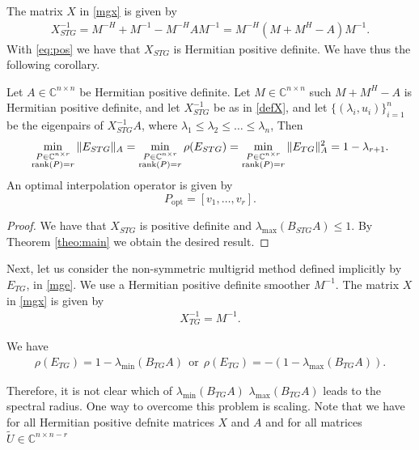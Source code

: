 \documentclass[final]{siamltex}
\newcommand{\innCnmr}{\in\mathbb{C}^{n-r}}
\newcommand{\beqo}{\begin{eqnarray*}}
\newcommand{\beq}{\begin{eqnarray}}
\newcommand{\eeqo}{\end{eqnarray*}}
\newcommand{\eeq}{\end{eqnarray}}
\numberwithin{equation}{section}
\newcommand{\ran} {{\cal R}}
\newcommand{\bCn}{\mathbb{C}^n}
\newcommand{\Cnr}{\mathbb{C}^{n \times r}}
\newcommand{\Cnnr}{\mathbb{C}^{n \times n-r}}
\newcommand{\inCnn}{\in \mathbb{C}^{n \times n}}
\begin{document}
The matrix $X$ in \eqref{mgx} is given by 
\beq \label{defX}
X^{-1}_{STG} = M^{-H} +  M^{-1} - M^{-H} AM^{-1} = M^{-H}( M +  M^{H} -
A)M^{-1}.
\eeq
With \eqref{eq:pos} we have  that $X_{STG}$ is Hermitian positive definite.
We have thus the following corollary.
\begin{corollary} \label{coro:one}
Let  $A\inCnn$  be Hermitian positive definite. Let $ M \inCnn$ such $M + M^H -
A$ is Hermitian positive definite, and
let $X_{STG}^{-1}$  be as in \eqref{defX},  and let $\{(\lambda_i,
u_i)\}_{i=1}^n$
be
the eigenpairs
of $X_{STG}^{-1}A$, where $
\lambda_1 \leq \lambda_2 \leq \ldots \leq  \lambda_n $, 
 Then
\beq
\min_{\substack{P \in \Cnr \\ \rank(P)=r}} \|E_{STG}\|_A =
\min_{\substack{P \in \Cnr \\ \rank(P)=r}}\rho(E_{STG}) = 
\min_{\substack{P \in \Cnr \\ \rank(P)=r}}\|E_{TG}\|_A^2 = 1 -
\lambda_{r+1}.
\eeq
An optimal interpolation operator is given by 
\[
P_{\mathrm{opt}} = [v_{1}, \ldots , v_r].
\]
\end{corollary}
\begin{proof}
We have  that $X_{STG}$ is positive definite and $\lambda_{\max}(B_{STG}A) \leq
1$. By Theorem \ref{theo:main} we obtain the desired result.
\end{proof}

Next, let us consider  the non-symmetric multigrid method defined implicitly
by $E_{TG}$, in \eqref{mge}.
We use a Hermitian positive  definite smoother $M^{-1}$. The matrix $X$ in
\eqref{mgx} is given by
\beq \label{defXtg}
X^{-1}_{TG} = M^{-1}.
\eeq

We have
\beqo
\rho(E_{TG}) = 1 - \lambda_{\min}(B_{TG}A)
\ \  \mbox{or} \ \ 
\rho(E_{TG}) = -(1 - \lambda_{\max}(B_{TG}A)).
\eeqo

Therefore, it is not clear which of $\lambda_{\min}(B_{TG}A)$ 
$\lambda_{\max}(B_{TG}A)$ leads to the spectral radius.
One way to overcome  this problem is scaling. Note that we  have for all
Hermitian positive defnite matrices $X$ and $A$ and for all matrices $\tilde U
\in \Cnnr$

\end{document}
